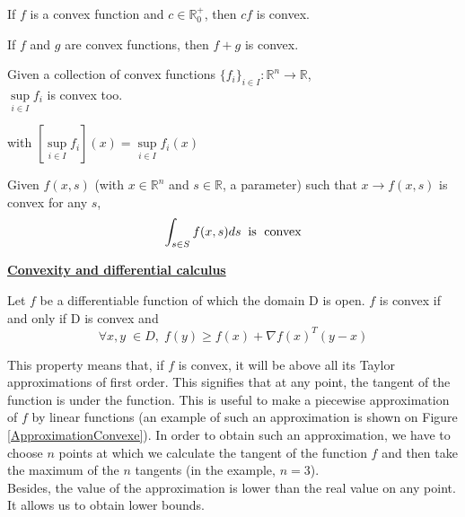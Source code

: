 \documentclass{article}
\begin{document}
\begin{myproperty}
If $f$ is a convex function and $c \in \mathbb{R}_0^+$, then $cf$ is convex.  
\end{myproperty}

\begin{myproperty}
If $f$ and $g$ are convex functions, then $f+g$ is convex. 
\end{myproperty}

\begin{myproperty}
Given a collection of convex functions $\{f_i\}_{i \in I}: \mathbb{R}^n \rightarrow \mathbb{R}$, \\
$\sup \limits _{i \in I}f_i$ is convex too. 
\end{myproperty}
with $\left[ \sup \limits _{i \in I} f_i\right] (x)= \sup \limits _{i \in I} f_i(x)$

\begin{myproperty}
Given $f(x,s)$ (with $x \in \mathbb{R}^n$ and $s \in \mathbb{R}$, a parameter) such that $x \rightarrow f(x,s)$ is convex for any $s$, 
$$\int_{s \in S}f(x,s)ds\;\; \text{is \;convex}$$
\end{myproperty}

\bigskip

\bigskip

\underline{\textbf{Convexity and differential calculus}}
\begin{myproperty}
Let $f$ be a differentiable function of which the domain D is open. 
$f$ is convex if and only if D is convex and
$$\forall x,y \; \in D, \;f(y)\geq f(x)+\nabla f(x)^T(y-x) $$
\end{myproperty}
This property means that, if $f$ is convex, it will be above all its Taylor approximations of first order. This signifies that at any point, the tangent of the function is under the function. This is useful to make a piecewise approximation of $f$ by linear functions (an example of such an approximation is shown on Figure \ref{ApproximationConvexe}). In order to obtain such an approximation, we have to choose $n$ points at which we calculate the tangent of the function $f$ and then take the maximum of the $n$ tangents (in the example, $n=3$). \\
Besides, the value of the approximation is lower than the real value on any point. It allows us to obtain lower bounds. 
\\
\end{document}
